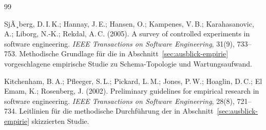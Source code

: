 ﻿\documentclass[a4paper,12pt]{report}
\theoremstyle{definition}
\theoremstyle{remark}
\begin{document}
\begin{thebibliography}{99}

SjÃ¸berg, D.\,I.\,K.; Hannay, J.\,E.; Hansen, O.; Kampenes, V.\,B.;
Karahasanovic, A.; Liborg, N.-K.; Rekdal, A.\,C. (2005).
\newblock A survey of controlled experiments in software engineering.
\newblock \emph{IEEE Transactions on Software Engineering}, 31(9), 733--753.
\newblock Methodische Grundlage für die in
Abschnitt~\ref{sec:ausblick-empirie} vorgeschlagene empirische Studie
zu Schema-Topologie und Wartungsaufwand.

Kitchenham, B.\,A.; Pfleeger, S.\,L.; Pickard, L.\,M.; Jones, P.\,W.;
Hoaglin, D.\,C.; El Emam, K.; Rosenberg, J. (2002).
\newblock Preliminary guidelines for empirical research in software
engineering.
\newblock \emph{IEEE Transactions on Software Engineering}, 28(8), 721--734.
\newblock Leitlinien für die methodische Durchführung der in
Abschnitt~\ref{sec:ausblick-empirie} skizzierten Studie.


\end{thebibliography}
\end{document}
